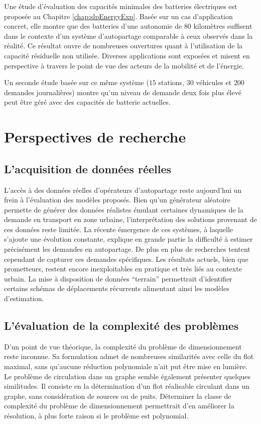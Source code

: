 \medskip
Une étude d'évaluation des capacités minimales des batteries électriques est proposée au Chapitre \ref{chap:slpEnergyExp}.
Basée sur un cas d'application concret, elle montre que des batteries d'une autonomie de $80$ kilomètres suffisent dans le contexte d'un système d'autopartage comparable à ceux observés dans la réalité.
Ce résultat ouvre de nombreuses ouvertures quant à l'utilisation de la capacité résiduelle non utilisée.
Diverses applications sont exposées et misent en perspective à travers le point de vue des acteurs de la mobilité et de l'énergie.

Un seconde étude basée sur ce même système ($15$ stations, $30$ véhicules et $200$ demandes journalières) montre qu'un niveau de demande deux fois plus élevé peut être géré avec des capacités de batterie actuelles.

\newpage
\section*{Perspectives de recherche}
\subsection*{L'acquisition de données réelles}

L'accès à des données réelles d'opérateurs d'autopartage reste aujourd'hui un frein à l'évaluation des modèles proposés.
Bien qu'un générateur aléatoire permette de générer des données réalistes émulant certaines dynamiques de la demande en transport en zone urbaine, l'interprétation des solutions provenant de ces données reste limitée.
La récente émergence de ces systèmes, à laquelle s'ajoute une évolution constante, explique en grande partie la difficulté à estimer précisément les demandes en autopartage.
De plus en plus de recherches tentent cependant de capturer ces demandes spécifiques.
Les résultats actuels, bien que prometteurs, restent encore inexploitables en pratique et très liés au contexte urbain.
La mise à disposition de données ``terrain'' permettrait d'identifier certains schémas de déplacements récurrents alimentant ainsi les modèles d'estimation.

\subsection*{L'évaluation de la complexité des problèmes}
D'un point de vue théorique, la complexité du problème de dimensionnement reste inconnue.
Sa formulation admet de nombreuses similarités avec celle du flot maximal, sans qu'aucune réduction polynomiale n'ait put être mise en lumière.
Le problème de circulation dans un graphe semble également présenter quelques similitudes.
Il consiste en la détermination d'un flot réalisable circulant dans un graphe, sans considération de sources ou de puits.
Déterminer la classe de complexité du problème de dimensionnement permettrait d'en améliorer la résolution, à plus forte raison si le problème est polynomial.

